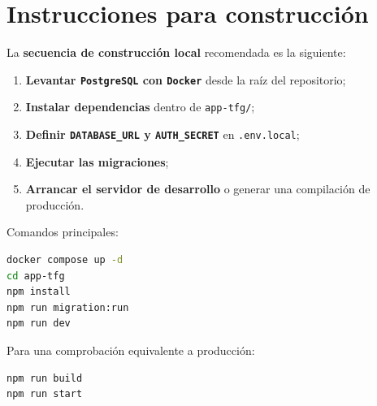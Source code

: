 \section{Instrucciones para construcción}

La \textbf{secuencia de construcción local} recomendada es la siguiente:

\begin{enumerate}
    \item \textbf{Levantar \texttt{PostgreSQL} con \texttt{Docker}} desde la raíz del repositorio;
    \item \textbf{Instalar dependencias} dentro de \texttt{app-tfg/};
    \item \textbf{Definir \texttt{DATABASE\_URL} y \texttt{AUTH\_SECRET}} en \texttt{.env.local};
    \item \textbf{Ejecutar las migraciones};
    \item \textbf{Arrancar el servidor de desarrollo} o generar una compilación de producción.
\end{enumerate}

Comandos principales:

\begin{lstlisting}[language=bash]
docker compose up -d
cd app-tfg
npm install
npm run migration:run
npm run dev
\end{lstlisting}

Para una comprobación equivalente a producción:

\begin{lstlisting}[language=bash]
npm run build
npm run start
\end{lstlisting}
